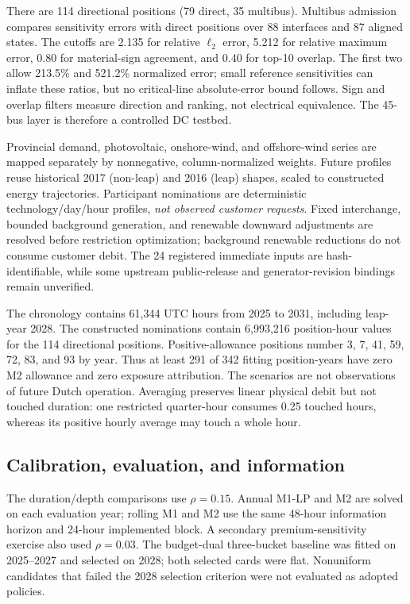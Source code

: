 \documentclass[10pt,journal]{IEEEtran}
\begin{document}
There are 114 directional positions (79 direct, 35 multibus). Multibus admission compares sensitivity errors with direct positions over 88 interfaces and 87 aligned states. The cutoffs are 2.135 for relative $\ell_2$ error, 5.212 for relative maximum error, 0.80 for material-sign agreement, and 0.40 for top-10 overlap. The first two allow 213.5\% and 521.2\% normalized error; small reference sensitivities can inflate these ratios, but no critical-line absolute-error bound follows. Sign and overlap filters measure direction and ranking, not electrical equivalence. The 45-bus layer is therefore a controlled DC testbed.

Provincial demand, photovoltaic, onshore-wind, and offshore-wind series are mapped separately by nonnegative, column-normalized weights. Future profiles reuse historical 2017 (non-leap) and 2016 (leap) shapes, scaled to constructed energy trajectories. Participant nominations are deterministic technology/day/hour profiles, \emph{not observed customer requests}. Fixed interchange, bounded background generation, and renewable downward adjustments are resolved before restriction optimization; background renewable reductions do not consume customer debit. The 24 registered immediate inputs are hash-identifiable, while some upstream public-release and generator-revision bindings remain unverified.

The chronology contains 61,344 UTC hours from 2025 to 2031, including leap-year 2028. The constructed nominations contain 6,993,216 position-hour values for the 114 directional positions. Positive-allowance positions number 3, 7, 41, 59, 72, 83, and 93 by year. Thus at least 291 of 342 fitting position-years have zero M2 allowance and zero exposure attribution. The scenarios are not observations of future Dutch operation. Averaging preserves linear physical debit but not touched duration: one restricted quarter-hour consumes 0.25 touched hours, whereas its positive hourly average may touch a whole hour.

\subsection{Calibration, evaluation, and information}
The duration/depth comparisons use $\rho=0.15$. Annual M1-LP and M2 are solved on each evaluation year; rolling M1 and M2 use the same 48-hour information horizon and 24-hour implemented block. A secondary premium-sensitivity exercise also used $\rho=0.03$. The budget-dual three-bucket baseline was fitted on 2025--2027 and selected on 2028; both selected cards were flat. Nonuniform candidates that failed the 2028 selection criterion were not evaluated as adopted policies.
\end{document}
